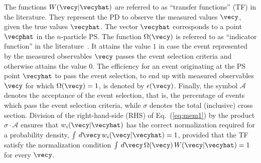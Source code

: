 The functions $W(\vecy|\vecyhat)$ are referred to as ``transfer functions'' (TF) in the literature.
They represent the PD to observe the measured values $\vecy$, given the true values $\vecyhat$.
The vector $\vecyhat$ corresponds to a point $\vecphat$ in the $n$-particle PS.
The function $\Omega(\vecy)$ is referred to as ``indicator function'' in the literature~\cite{Fiedler:2010sg,Volobouev:2011vb}.
It attains the value $1$ in case the event represented by the measured observables $\vecy$ passes the event selection criteria and otherwise attains the value $0$.
The efficiency for an event originating at the PS point
$\vecyhat$ to pass the event selection, \ie to end up with measured
observables $\vecy$ for which $\Omega(\vecy) = 1$,
is denoted by $\epsilon(\vecy)$. 
Finally, the symbol $\mathcal{A}$ denotes the acceptance of the event selection, 
that is, the percentage of events which pass the event selection criteria,
while $\sigma$ denotes the total (inclusive) cross section.
Division of the right-hand-side (RHS) of Eq.~(\ref{eq:mem1}) by the product $\sigma \cdot \mathcal{A}$
ensures that $w_{i}(\vecy|\vecyhat)$ has the correct normalization required for a probability density, 
\ie $\int \, d\vecy \, w_{i}(\vecy|\vecyhat) = 1$,
provided that the TF satisfy the normalization condition
$\int \, d\vecy \, \Omega(\vecy) \, W(\vecy|\vecyhat) = 1$
for every $\vecy$.

